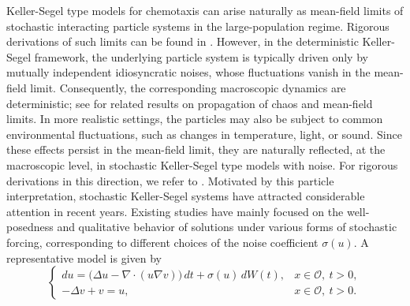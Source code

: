 \documentclass[reqno, 11pt]{amsart}
\theoremstyle{definition}
\numberwithin{equation}{section} \numberwithin{lem}{section}
\numberwithin{thm}{section} \numberwithin{prop}{section}
\numberwithin{cor}{section} \numberwithin{rem}{section}
\numberwithin{defn}{section}
\begin{document}
 Keller-Segel type models for chemotaxis can arise naturally as mean-field limits of stochastic interacting particle systems in the large-population regime. Rigorous derivations of such limits can be found in \cite{stevens2000derivation,stevens2000stochastic}. However, in the deterministic Keller-Segel framework, the underlying particle system is typically driven only by mutually independent idiosyncratic noises, whose fluctuations vanish in the mean-field limit. Consequently, the corresponding macroscopic dynamics are deterministic; see \cite{jabin2017mean} for related results on propagation of chaos and mean-field limits.
 In more realistic settings, the particles may also be subject to common environmental fluctuations, such as changes in temperature, light, or sound. Since these effects persist in the mean-field limit, they are naturally reflected, at the macroscopic level, in stochastic Keller-Segel type models with noise. 
 For rigorous derivations in this direction, we refer to \cite{chen2025hegselmann, huang2021microscopic,nikolaev2025quantitative}. Motivated by this particle interpretation, stochastic Keller-Segel systems have attracted considerable attention in recent years. Existing studies have mainly focused on the well-posedness and qualitative behavior of solutions under various forms of stochastic forcing, corresponding to different choices of the noise coefficient \(\sigma(u)\). A representative model is given by  
\begin{equation}\label{classical_S_K}
\begin{cases}
du = \big(\Delta u-\nabla\cdot(u\nabla v)\big)\,dt+\sigma(u)\,dW(t),
& x\in\mathcal{O},\ t>0,\\
-\Delta v+v = u,
& x\in\mathcal{O},\ t>0.
\end{cases}
\end{equation}
\end{document}
